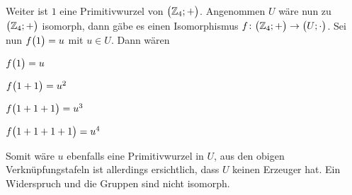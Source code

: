 \documentclass{scrreprt}
\begin{document}
Weiter ist $1$ eine Primitivwurzel von $\qty\big(\mathbb{Z}_4; +)$.
Angenommen $U$ wäre nun zu $\qty\big(\mathbb{Z}_4; +)$ isomorph, dann gäbe es
einen Isomorphismus $f \colon \qty\big(\mathbb{Z}_4; +) \to \qty\big(U; \cdot)$.
Sei nun $f\qty\big(1) = u$ mit $u \in U$.
Dann wären


\begin{inline}
\item $f\qty\big(1) = u$
\item $f\qty\big(1 + 1) = u^2$
\item $f\qty\big(1 + 1 + 1) = u^3$
\item $f\qty\big(1 + 1 + 1 + 1) = u^4$
\end{inline}

Somit wäre $u$ ebenfalls eine Primitivwurzel in $U$, aus den obigen
Verknüpfungstafeln ist allerdings ersichtlich, dass $U$ keinen Erzeuger hat.
Ein Widerspruch und die Gruppen sind nicht isomorph.
\end{document}
